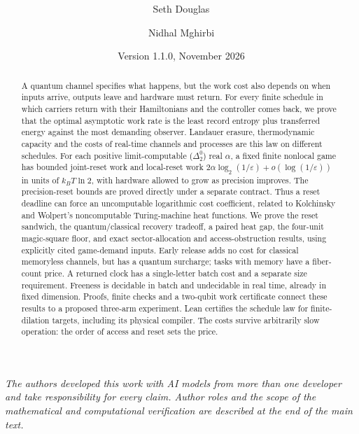 \documentclass[11pt]{article}
\title{\textbf{\papertitle}\ifx\papersubtitle\empty\else\\[6pt]\large\papersubtitle\fi}
\author{Seth Douglas \and Nidhal Mghirbi}
\date{Version 1.1.0, November 2026}
\numberwithin{equation}{section}
\theoremstyle{definition}
\theoremstyle{remark}
\begin{document}
\maketitle

\begin{abstract}
A quantum channel specifies what happens, but the work cost also depends on when inputs arrive, outputs leave and hardware must return. For every finite schedule in which carriers return with their Hamiltonians and the controller comes back, we prove that the optimal asymptotic work rate is the least record entropy plus transferred energy against the most demanding observer. Landauer erasure, thermodynamic capacity and the costs of real-time channels and processes are this law on different schedules. For each positive limit-computable ($\Delta^0_2$) real $\alpha$, a fixed finite nonlocal game has bounded joint-reset work and local-reset work $2\alpha\log_2(1/\varepsilon)+o(\log(1/\varepsilon))$ in units of $k_BT\ln2$, with hardware allowed to grow as precision improves. The precision-reset bounds are proved directly under a separate contract. Thus a reset deadline can force an uncomputable logarithmic cost coefficient, related to Kolchinsky and Wolpert's noncomputable Turing-machine heat functions. We prove the reset sandwich, the quantum/classical recovery tradeoff, a paired heat gap, the four-unit magic-square floor, and exact sector-allocation and access-obstruction results, using explicitly cited game-demand inputs. Early release adds no cost for classical memoryless channels, but has a quantum surcharge; tasks with memory have a fiber-count price. A returned clock has a single-letter batch cost and a separate size requirement. Freeness is decidable in batch and undecidable in real time, already in fixed dimension. Proofs, finite checks and a two-qubit work certificate connect these results to a proposed three-arm experiment. Lean certifies the schedule law for finite-dilation targets, including its physical compiler. The costs survive arbitrarily slow operation: the order of access and reset sets the price.
\end{abstract}

\noindent\emph{The authors developed this work with AI models from more than one developer and take responsibility for every claim. Author roles and the scope of the mathematical and computational verification are described at the end of the main text.}

\par

\setcounter{tocdepth}{1}
{\small\tableofcontents}
\end{document}
